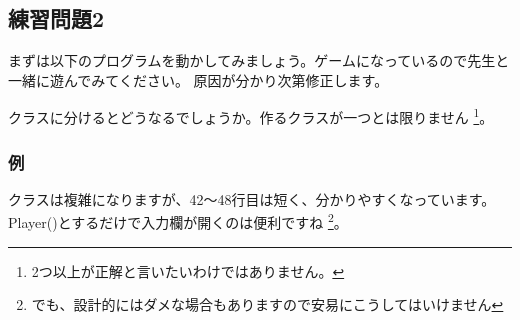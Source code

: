 \subsection{練習問題2}
まずは以下のプログラムを動かしてみましょう。ゲームになっているので先生と一緒に遊んでみてください。
原因が分かり次第修正します。

クラスに分けるとどうなるでしょうか。作るクラスが一つとは限りません
\footnote{2つ以上が正解と言いたいわけではありません。}。

\newpage
\subsubsection{例}

クラスは複雑になりますが、42〜48行目は短く、分かりやすくなっています。Player()とするだけで入力欄が開くのは便利ですね
\footnote{でも、設計的にはダメな場合もありますので安易にこうしてはいけません}。
